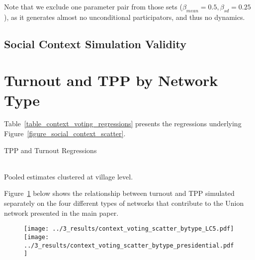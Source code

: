 \documentclass[12pt]{article}
\begin{document}
\begin{appendix}
Note that we exclude one parameter pair from those sets ($\beta_{mean}=0.5, \beta_{sd}=0.25$), as it generates almost no unconditional participators, and thus no dynamics.


\pagebreak
\begin{landscape}
    \section{Social Context Simulation Validity}\label{appendix_socialcontext_validity}


\end{landscape}
\pagebreak
\begin{landscape}
    
    
\end{landscape}
\pagebreak
\begin{landscape}
    
\end{landscape}
\pagebreak

\section{Turnout and TPP by Network Type}\label{appendix_core_result_by_network_type}

Table~\ref{table_context_voting_regressions} presents the regressions underlying Figure~\ref{figure_social_context_scatter}.

\begin{table}
	\caption{TPP and Turnout Regressions}\label{table_context_voting_regressions}
	 \\
	Pooled estimates clustered at village level.
\end{table}

Figure~\ref{figure_context_friends_family_separately} below shows the relationship between turnout and TPP simulated separately on the four different types of networks that contribute to the Union network presented in the main paper.


\begin{figure}[h!]
	\begin{center}
	    \caption{}\label{figure_context_friends_family_separately}
    		\texttt{[image: ../3\_results/context\_voting\_scatter\_bytype\_LC5.pdf]}
            \texttt{[image: ../3\_results/context\_voting\_scatter\_bytype\_presidential.pdf]}
    \end{center}
\end{figure}
\pagebreak



\end{appendix}
\end{document}
